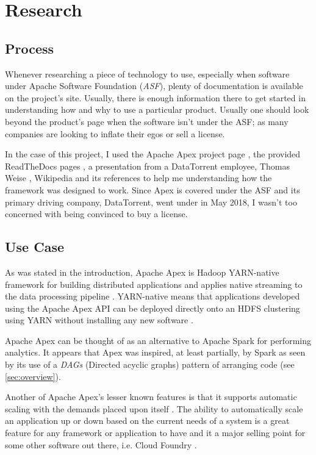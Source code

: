 \documentclass[final]{IEEEtran}
\begin{document}
\section{Research}
\subsection{Process}
Whenever researching a piece of technology to use, especially when software under Apache Software Foundation (\emph{ASF}), plenty of documentation is available on the project's site. Usually, there is enough information there to get started in understanding how and why to use a particular product. Usually one should look beyond the product's page when the software isn't under the ASF; as many companies are looking to inflate their egos or sell a license.

In the case of this project, I used the Apache Apex project page \cite{APEX}, the provided ReadTheDocs pages\cite{APEXrtd_dt} \cite{APEXrtd_apache} \cite{MALHAR-DOCS}, a presentation from a DataTorrent employee, Thomas Weise \cite{WEISE}, Wikipedia and its references \cite{WIKI} \cite{DATANAMI} to help me understanding how the framework was designed to work. Since Apex is covered under the ASF and its primary driving company, DataTorrent, went under in May 2018, I wasn't too concerned with being convinced to buy a license.

\subsection{Use Case}
As was stated in the introduction, Apache Apex is Hadoop YARN-native framework for building distributed applications and applies native streaming to the data processing pipeline \cite{WEISE}. YARN-native means that applications developed using the Apache Apex API can be deployed directly onto an HDFS clustering using YARN without installing any new software \cite{WEISE2}.

Apache Apex can be thought of as an alternative to Apache Spark for performing analytics. It appears that Apex was inspired, at least partially, by Spark as seen by its use of a \emph{DAGs} (Directed acyclic graphs) pattern of arranging code (see \ref{sec:overview}).

Another of Apache Apex's lesser known features is that it supports automatic scaling with the demands placed upon itself \cite{WEISE2}. The ability to automatically scale an application up or down based on the current needs of a system is a great feature for any framework or application to have and it a major selling point for some other software out there, i.e. Cloud Foundry \cite{CF}.
\end{document}

